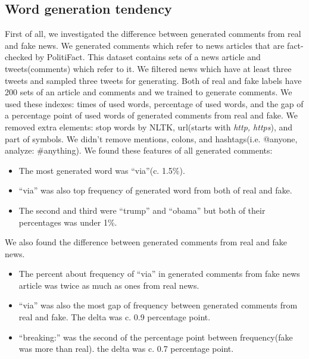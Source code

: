 \documentclass[conference]{IEEEtran}
\begin{document}
\subsection{Word generation tendency}
\label{subsec:trend}
First of all, we investigated the difference between generated comments from real and fake news.
We generated comments which refer to news articles that are fact-checked by PolitiFact.
This dataset contains sets of a news article and tweets(comments) which refer to it.
We filtered news which have at least three tweets and sampled three tweets for generating.
Both of real and fake labels have 200 sets of an article and comments and we trained to generate comments. 
We used these indexes: times of used words, percentage of used words, and the gap of a percentage point of used words of generated comments from real and fake.
We removed extra elements: stop words by NLTK, url(starts with \textit{http, https}), and part of symbols.
We didn't remove mentions, colons, and hashtags(i.e. @anyone, analyze: \#anything).
We found these features of all generated comments:
\begin{itemize}[]
    \item The most generated word was ``via''(c. 1.5\%).  
    \item ``via'' was also top frequency of generated word from both of real and fake. 
    \item The second and third were ``trump'' and ``obama'' but both of their percentages was under 1\%.
\end{itemize}
We also found the difference between generated comments from real and fake news.
\begin{itemize}[]
    \item The percent about frequency of ``via'' in generated comments from fake news article was twice as much as ones from real news.
    \item ``via'' was also the most gap of frequency between generated comments from real and fake.  The delta was c. 0.9 percentage point.
    \item ``breaking:'' was the second of the percentage point between frequency(fake was more than real). the delta was c. 0.7 percentage point.
\end{itemize}
\end{document}
